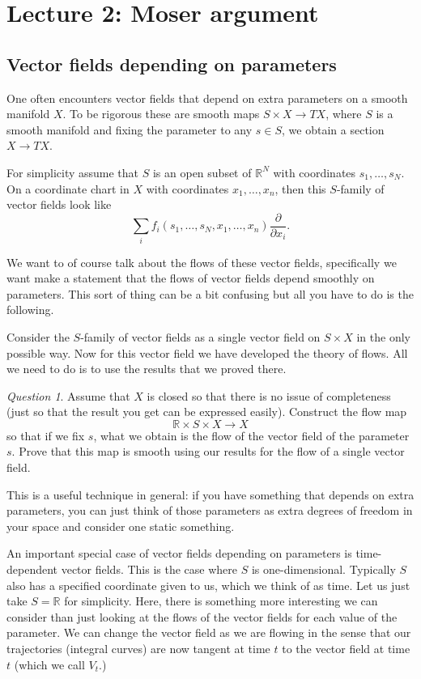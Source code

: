 \documentclass[12pt]{amsart}
\theoremstyle{remark}
\newtheorem{question}{Question}
\begin{document}
\section{Lecture 2: Moser argument}
\subsection{Vector fields depending on parameters}

 One often encounters vector fields that depend on extra parameters on a smooth manifold $X$. To be rigorous these are smooth maps $S\times X\to TX$, where $S$ is a smooth manifold and fixing the parameter to any $s\in S$, we obtain a section $X\to TX$.

For simplicity assume that $S$ is an open subset of $\mathbb{R}^N$ with coordinates $s_1,\ldots,s_N$. On a coordinate chart in $X$ with coordinates $x_1,\ldots ,x_n$, then this $S$-family of vector fields look like $$\sum_i f_i(s_1,\ldots,s_N,x_1,\ldots,x_n)\frac{\partial}{\partial x_i}.$$

We want to of course talk about the flows of these vector fields, specifically we want make a statement that the flows of vector fields depend smoothly on parameters. This sort of thing can be a bit confusing but all you have to do is the following.

Consider the $S$-family of vector fields as a single vector field on $S\times X$ in the only possible way. Now for this vector field we have developed the theory of flows. All we need to do is to use the results that we proved there.

\begin{question}
Assume that $X$ is closed so that there is no issue of completeness (just so that the result you get can be expressed easily). Construct the flow map $$\mathbb{R}\times S\times X\to X$$ so that if we fix $s$, what we obtain is the flow of the vector field of the parameter $s$. Prove that this map is smooth using our results for the flow of a single vector field. 
\end{question}

This is a useful technique in general: if you have something that depends on extra parameters, you can just think of those parameters as extra degrees of freedom in your space and consider one static something.

An important special case of vector fields depending on parameters is time-dependent vector fields. This is the case where $S$ is one-dimensional. Typically $S$ also has a specified coordinate given to us, which we think of as time. Let us just take $S=\mathbb{R}$ for simplicity. Here, there is something more interesting we can consider than just looking at the flows of the vector fields for each value of the parameter. We can change the vector field as we are flowing in the sense that our trajectories (integral curves) are now tangent at time $t$ to the vector field at time $t$ (which we call $V_t$.)
\end{document}
